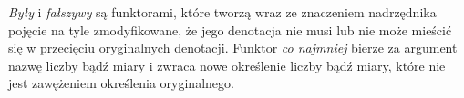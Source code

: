 \documentclass[12pt]{mwart}
\theoremstyle{remark}
\begin{document}
\emph{Były} i \emph{fałszywy} są funktorami, które tworzą wraz ze znaczeniem nadrzędnika pojęcie na tyle zmodyfikowane, że jego denotacja nie musi lub nie może mieścić się w przecięciu oryginalnych denotacji.
Funktor \emph{co najmniej} bierze za argument nazwę liczby bądź miary i zwraca nowe określenie liczby bądź miary, które nie jest zawężeniem określenia oryginalnego.






\end{document}
